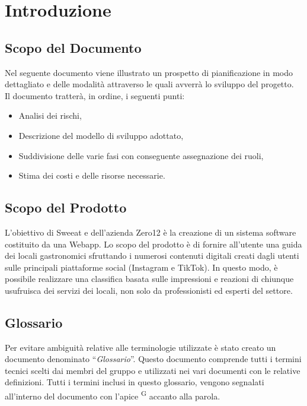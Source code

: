 \section{Introduzione}

\subsection{Scopo del Documento}
Nel seguente documento viene illustrato un prospetto di pianificazione in modo dettagliato e delle modalità attraverso le quali avverrà lo sviluppo del progetto. \mbox{} \\
Il documento tratterà, in ordine, i seguenti punti:
\begin{itemize}
\item Analisi dei rischi,
\item Descrizione del modello di sviluppo adottato,
\item Suddivisione delle varie fasi con conseguente assegnazione dei ruoli,
\item Stima dei costi e delle risorse necessarie.
\end{itemize}

\subsection{Scopo del Prodotto}

L’obiettivo di Sweeat e dell’azienda Zero12 è la creazione di un sistema software costituito da una Webapp. Lo scopo del prodotto è di fornire all’utente una guida dei locali gastronomici sfruttando i numerosi contenuti digitali creati dagli utenti sulle principali piattaforme social (Instagram e TikTok). In questo modo, è possibile realizzare una classifica basata sulle impressioni e reazioni di chiunque usufruisca dei servizi dei locali, non solo da professionisti ed esperti del settore.

\subsection{Glossario}

Per evitare ambiguità relative alle terminologie utilizzate è stato creato un documento denominato “\textit{Glossario}”. Questo documento comprende tutti i termini tecnici scelti dai membri del gruppo e utilizzati nei vari documenti con le relative definizioni. Tutti i termini inclusi in questo glossario, vengono segnalati all’interno del documento con l’apice \textsuperscript{G} accanto alla parola.

